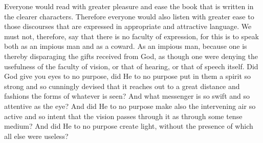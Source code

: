 Everyone would read with greater pleasure and ease the book that is written in the clearer characters. Therefore everyone would also listen with greater ease to those discourses that are expressed in appropriate and attractive language. We must not, therefore, say that there is no faculty of expression, for this is to speak both as an impious man and as a coward. As an impious man, because one is thereby disparaging the gifts received from God, as though one were denying the usefulness of the faculty of vision, or that of hearing, or that of speech itself. Did God give you eyes to no purpose, did He to no purpose put in them a spirit so strong and so cunningly devised that it reaches out to a great distance and fashions the forms of whatever is seen? And what messenger is so swift and so attentive as the eye? And did He to no purpose make also the intervening air so active and so intent that the vision passes through it as through some tense medium? And did He to no purpose create light, without the presence of which all else were useless?

